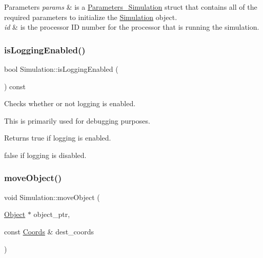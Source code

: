 \begin{DoxyParams}{Parameters}
{\em params} & is a \hyperlink{struct_parameters___simulation}{Parameters\+\_\+\+Simulation} struct that contains all of the required parameters to initialize the \hyperlink{class_simulation}{Simulation} object. \\
\hline
{\em id} & is the processor ID number for the processor that is running the simulation. \\
\hline
\end{DoxyParams}
\mbox{\label{class_simulation_ac7c8a49a4cc506b850891480e0aae512}} 
\subsubsection{\texorpdfstring{is\+Logging\+Enabled()}{isLoggingEnabled()}}
{\footnotesize\ttfamily bool Simulation\+::is\+Logging\+Enabled (\begin{DoxyParamCaption}{ }\end{DoxyParamCaption}) const}

Checks whether or not logging is enabled.

This is primarily used for debugging purposes. \begin{DoxyReturn}{Returns}
true if logging is enabled. 

false if logging is disabled. 
\end{DoxyReturn}
\mbox{\label{class_simulation_a7b10f51640088366d0d1278361817e8d}} 
\subsubsection{\texorpdfstring{move\+Object()}{moveObject()}}
{\footnotesize\ttfamily void Simulation\+::move\+Object (\begin{DoxyParamCaption}\item[{\hyperlink{class_object}{Object} $\ast$}]{object\+\_\+ptr,  }\item[{const \hyperlink{struct_coords}{Coords} \&}]{dest\+\_\+coords }\end{DoxyParamCaption})\hspace{0.3cm}{\ttfamily [protected]}}



